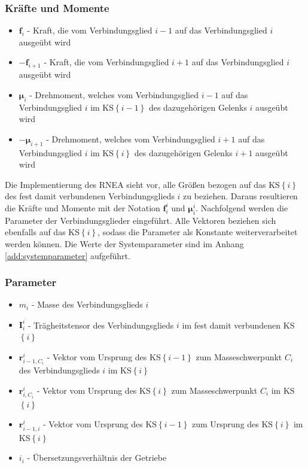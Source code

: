 \subsubsection*{Kräfte und Momente}
\begin{itemize}
	\item $ \boldsymbol{f}_i $ - Kraft, die vom Verbindungsglied $ i-1 $ auf das Verbindungsglied $ i $ ausgeübt wird
	\item $ -\boldsymbol{f}_{i+1} $ - Kraft, die vom Verbindungsglied $ i+1 $ auf das Verbindungsglied $ i $ ausgeübt wird
	\item $ \boldsymbol{\mu}_i $ - Drehmoment, welches vom Verbindungsglied $ i-1 $ auf das Verbindungsglied $ i $ im KS$\left\{i-1\right\}$ des dazugehörigen Gelenks $i$ ausgeübt wird
	\item $ -\boldsymbol{\mu}_{i+1} $ - Drehmoment, welches vom Verbindungsglied $ i+1 $ auf das Verbindungsglied $ i $ im KS$\left\{i\right\}$ des dazugehörigen Gelenks $i+1$ ausgeübt wird
\end{itemize}
%
Die Implementierung des RNEA sieht vor, alle Größen bezogen auf das KS$\left\{i\right\}$ des fest damit verbundenen Verbindungsglieds $i$ zu beziehen. Daraus resultieren die Kräfte und Momente mit der Notation $ \boldsymbol{f}_{i}^{i} $ und $ \boldsymbol{\mu}_i^{i} $. Nachfolgend werden die Parameter der Verbindungsglieder eingeführt. Alle Vektoren beziehen sich ebenfalls auf das KS$\left\{i\right\}$, sodass die Parameter als Konstante weiterverarbeitet werden können. Die Werte der Systemparameter sind im Anhang \ref{add:systemparameter} aufgeführt.
%
\subsubsection*{Parameter}
\begin{itemize}
	\item $ m_i $ - Masse des Verbindungsglieds $i$
	\item $ \bm{I}^{i}_{i} $ - Trägheitstensor des Verbindungsglieds $i$ im fest damit verbundenen KS$\left\{i\right\}$ 
	\item $ \boldsymbol{r}^{i}_{i-1,C_i} $ - Vektor vom Ursprung des KS$\left\{i-1\right\}$ zum Masseschwerpunkt $ C_i $ des Verbindungsglieds $i$ im KS$\left\{i\right\}$ 
	\item $ \boldsymbol{r}^{i}_{i,C_i} $ - Vektor vom Ursprung des KS$\left\{i\right\}$ zum Masseschwerpunkt $ C_i $ im KS$\left\{i\right\}$ 
	\item $ \boldsymbol{r}^{i}_{i-1,i} $ - Vektor vom Ursprung des KS$\left\{i-1\right\}$ zum Ursprung des  KS$\left\{i\right\}$ im KS$\left\{i\right\}$ 
	\item $ i_i$ - Übersetzungsverhältnis der Getriebe
\end{itemize}
%
